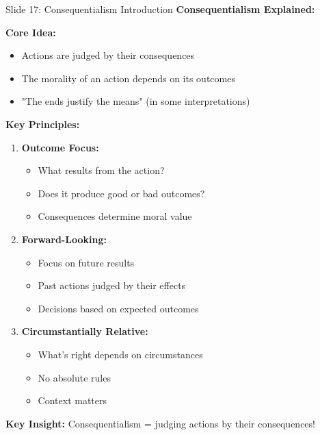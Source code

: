\documentclass[8pt]{beamer}
\begin{document}
	\begin{frame}{Slide 17: Consequentialism Introduction}
		\fontsize{6.5}{7.5}\selectfont
		\textbf{Consequentialism Explained:}
		
		\vspace{0.1cm}
		\textbf{Core Idea:}
		\begin{itemize}
			\item Actions are judged by their consequences
			\item The morality of an action depends on its outcomes
			\item "The ends justify the means" (in some interpretations)
		\end{itemize}
		
		\vspace{0.1cm}
		\textbf{Key Principles:}
		\begin{enumerate}
			\item \textbf{Outcome Focus:}
			\begin{itemize}
				\item What results from the action?
				\item Does it produce good or bad outcomes?
				\item Consequences determine moral value
			\end{itemize}
			\item \textbf{Forward-Looking:}
			\begin{itemize}
				\item Focus on future results
				\item Past actions judged by their effects
				\item Decisions based on expected outcomes
			\end{itemize}
			\item \textbf{Circumstantially Relative:}
			\begin{itemize}
				\item What's right depends on circumstances
				\item No absolute rules
				\item Context matters
			\end{itemize}
		\end{enumerate}
		
		\textcolor{myblue}{\textbf{Key Insight:}} Consequentialism = \textcolor{myblue}{judging actions by their consequences}!
	\end{frame}
	
\end{document}
